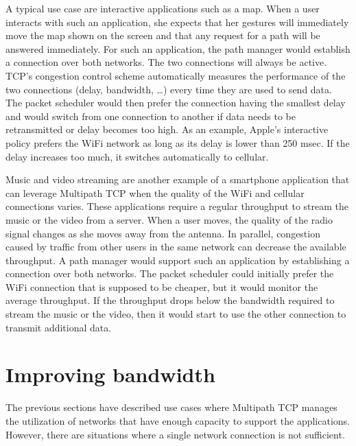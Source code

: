 \documentclass[letterpaper,10pt,english]{sphinxmanual}
\begin{document}
\sphinxAtStartPar
A typical use case are interactive applications such as a map. When a user interacts with such an application, she expects that her gestures will immediately move the map shown on the screen and that any request for a path will be answered immediately. For such an application, the path manager would establish a connection over both networks. The two connections will always be active. TCP’s congestion control scheme automatically measures the performance of the two connections (delay, bandwidth, …) every time they are used to send data. The packet scheduler would then prefer the connection having the smallest delay and would switch from one connection to another if data needs to be retransmitted or delay becomes too high. As an example, Apple’s interactive policy prefers the Wi\sphinxhyphen{}Fi network as long as its delay is lower than 250 msec. If the delay increases too much, it switches automatically to cellular.

\sphinxAtStartPar
Music and video streaming are another example of a smartphone application that can leverage Multipath TCP when the quality of the Wi\sphinxhyphen{}Fi and cellular connections varies. These applications require a regular throughput to stream the music or the video from a server. When a user moves, the quality of the radio signal changes as she moves away from the antenna. In parallel, congestion caused by traffic from other users in the same network can decrease the available throughput. A path manager would support such an application by establishing a connection over both networks. The packet scheduler could initially prefer the Wi\sphinxhyphen{}Fi connection that is supposed to be cheaper, but it would monitor the average throughput. If the throughput drops below the bandwidth required to stream the music or the video, then it would start to use the other connection to transmit additional data.


\section{Improving bandwidth}
\label{\detokenize{usecases:improving-bandwidth}}
\sphinxAtStartPar
The previous sections have described use cases where Multipath TCP manages the utilization of networks that have enough capacity to support the applications. However, there are situations where a single network connection is not sufficient.
\end{document}
